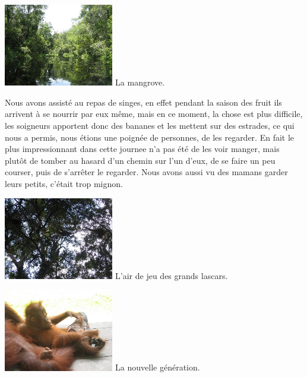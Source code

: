 \begin{multicols}{2}
\hspace*{-0.65cm}
\includegraphics[width=4.8cm]{articles/Borneo/1210332087kPql.jpg}
La mangrove.

Nous avons assisté au repas de singes, en effet pendant la saison des fruit ils arrivent à se nourrir par eux même, mais en ce moment, la chose est plus difficile, les soigneurs apportent donc des bananes et les mettent sur des estrades, ce qui nous a permis, nous étions une poignée de personnes, de les regarder. En fait le plus impressionnant dans cette journee n'a pas été de les voir manger, mais plutôt de tomber au hasard d'un chemin sur l'un d'eux, de se faire un peu courser, puis de s'arrêter le regarder. Nous avons aussi vu des mamans garder leurs petits, c'était trop mignon.

\hspace*{-0.65cm}
\includegraphics[width=4.8cm]{articles/Borneo/1210332096AngR.jpg}
L'air de jeu des grands lascars.

\hspace*{-0.65cm}
\includegraphics[width=4.8cm]{articles/Borneo/1210332100Imld.jpg}
La nouvelle génération.


\end{multicols}


